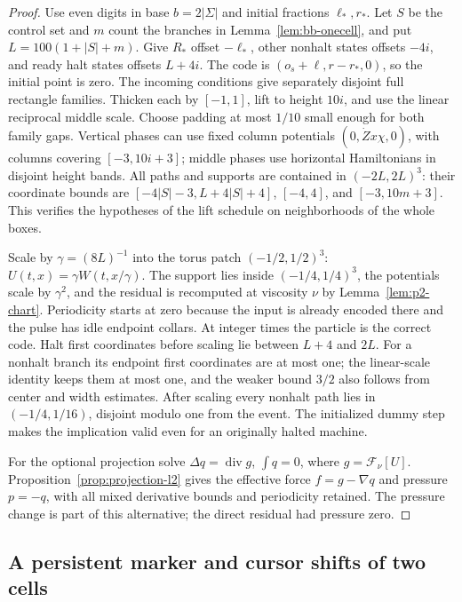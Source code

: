 \begin{proof}
Use even digits in base $b=2|\Sigma|$ and initial fractions
$\ell_*,r_*$.  Let $S$ be the control set and $m$ count the branches in
Lemma~\ref{lem:bb-onecell}, and put $L=100(1+|S|+m)$.
Give $R_*$ offset $-\ell_*$, other nonhalt states offsets $-4i$,
and ready halt states offsets $L+4i$.  The code is
$(o_s+\ell,r-r_*,0)$, so the initial point is zero.
The incoming conditions give separately disjoint full rectangle
families.  Thicken each by $[-1,1]$, lift to height $10i$, and use
the linear reciprocal middle scale.  Choose padding at most $1/10$
small enough for both family gaps.  Vertical phases can use fixed
column potentials $(0,\dot Z x\chi,0)$, with columns covering
$[-3,10i+3]$; middle phases use horizontal Hamiltonians in disjoint
height bands.  All paths and supports are contained in
$(-2L,2L)^3$: their coordinate bounds are
$[-4|S|-3,L+4|S|+4]$, $[-4,4]$, and $[-3,10m+3]$.
This verifies the hypotheses of the lift schedule on neighborhoods
of the whole boxes.

Scale by $\gamma=(8L)^{-1}$ into the torus patch
$(-1/2,1/2)^3$: $U(t,x)=\gamma W(t,x/\gamma)$.
The support lies inside $(-1/4,1/4)^3$, the potentials scale by
$\gamma^2$, and the residual is recomputed at viscosity $\nu$ by
Lemma~\ref{lem:p2-chart}.  Periodicity starts at zero
because the input is already encoded there and the pulse has idle
endpoint collars.  At integer times the particle is the correct code.
Halt first coordinates before scaling lie between $L+4$ and $2L$.
For a nonhalt branch its endpoint first coordinates are at most one;
the linear-scale identity keeps them at most one, and the weaker
bound $3/2$ also follows from center and width estimates.  After
scaling every nonhalt path lies in $(-1/4,1/16)$, disjoint modulo
one from the event.  The initialized dummy step makes the implication
valid even for an originally halted machine.

For the optional projection solve $\Delta q=\operatorname{div}g$,
$\int q=0$, where $g=\mathcal F_\nu[U]$.
Proposition~\ref{prop:projection-l2} gives the effective force
$f=g-\nabla q$ and pressure $p=-q$, with all mixed derivative bounds
and periodicity retained.  The pressure change is part of this
alternative; the direct residual had pressure zero.
\end{proof}

\subsection{A persistent marker and cursor shifts of two cells}
\label{sec:bb-marked-window}

